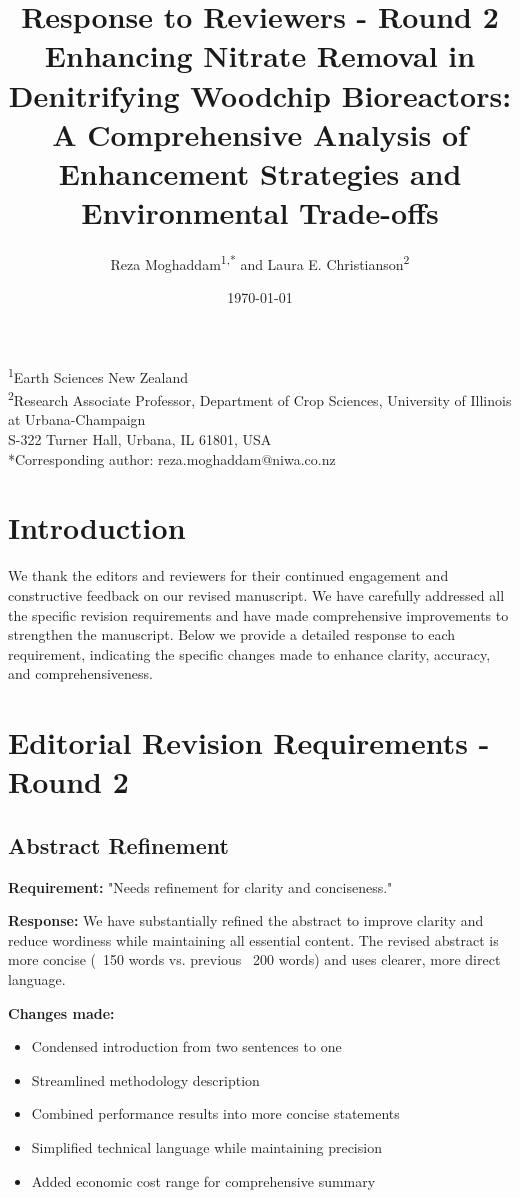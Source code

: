 \documentclass[12pt,a4paper]{article}
\title{Response to Reviewers - Round 2\\
\large Enhancing Nitrate Removal in Denitrifying Woodchip Bioreactors: A Comprehensive Analysis of Enhancement Strategies and Environmental Trade-offs}
\author{Reza Moghaddam\textsuperscript{1,*} and Laura E. Christianson\textsuperscript{2}}
\date{\today}
\begin{document}
\maketitle

\begin{center}
\footnotesize
\textsuperscript{1}Earth Sciences New Zealand\\
\textsuperscript{2}Research Associate Professor, Department of Crop Sciences, University of Illinois at Urbana-Champaign\\
S-322 Turner Hall, Urbana, IL 61801, USA\\
*Corresponding author: reza.moghaddam@niwa.co.nz
\end{center}

\section*{Introduction}

We thank the editors and reviewers for their continued engagement and constructive feedback on our revised manuscript. We have carefully addressed all the specific revision requirements and have made comprehensive improvements to strengthen the manuscript. Below we provide a detailed response to each requirement, indicating the specific changes made to enhance clarity, accuracy, and comprehensiveness.

\section{Editorial Revision Requirements - Round 2}

\subsection{Abstract Refinement}
\textbf{Requirement:} "Needs refinement for clarity and conciseness."

\textbf{Response:} We have substantially refined the abstract to improve clarity and reduce wordiness while maintaining all essential content. The revised abstract is more concise (~150 words vs. previous ~200 words) and uses clearer, more direct language.

\textbf{Changes made:} 
\begin{itemize}
\item Condensed introduction from two sentences to one
\item Streamlined methodology description
\item Combined performance results into more concise statements
\item Simplified technical language while maintaining precision
\item Added economic cost range for comprehensive summary
\end{itemize}
\end{document}
